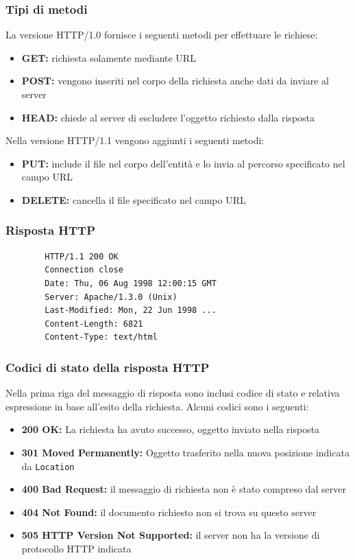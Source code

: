 \documentclass{report}
\begin{document}
	\subsubsection{Tipi di metodi}
	La versione HTTP/1.0 fornisce i seguenti metodi per effettuare le richiese:
	\begin{itemize}
		\item \textbf{GET:} richiesta solamente mediante URL
		\item \textbf{POST:} vengono inseriti nel corpo della richiesta anche dati da inviare al server
		\item \textbf{HEAD:} chiede al server di escludere l'oggetto richiesto dalla risposta
	\end{itemize}
	Nella versione HTTP/1.1 vengono aggiunti i seguenti metodi:
	\begin{itemize}
		\item \textbf{PUT:} include il file nel corpo dell'entità e lo invia al percorso specificato nel campo URL
		\item \textbf{DELETE:} cancella il file specificato nel campo URL
	\end{itemize}
	\subsubsection{Risposta HTTP}
	\begin{verbatim}
		HTTP/1.1 200 OK
		Connection close
		Date: Thu, 06 Aug 1998 12:00:15 GMT
		Server: Apache/1.3.0 (Unix)
		Last-Modified: Mon, 22 Jun 1998 ...
		Content-Length: 6821
		Content-Type: text/html
	\end{verbatim}
	\subsubsection{Codici di stato della risposta HTTP}
	Nella prima riga del messaggio di risposta sono inclusi codice di stato e relativa espressione in base all'esito della richiesta. Alcuni codici sono i seguenti:
	\begin{itemize}
		\item \textbf{200 OK:} La richiesta ha avuto successo, oggetto inviato nella risposta
		\item \textbf{301 Moved Permanently:} Oggetto trasferito nella nuova posizione indicata da \verb|Location|
		\item \textbf{400 Bad Request:} il messaggio di richiesta non è stato compreso dal server
		\item \textbf{404 Not Found:} il documento richiesto non si trova su questo server
		\item \textbf{505 HTTP Version Not Supported:} il server non ha la versione di protocollo HTTP indicata
	\end{itemize}
\end{document}
